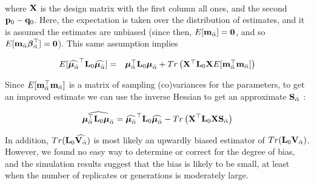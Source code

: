 \documentclass[12pt]{article}
\begin{document}
\begin{bibunit}
\begin{equation}
\begin{array}{rl}
\end{array}
\end{equation} 

where ${\bf X}$ is the design matrix with the first column all ones, and the second ${\bf p}_{0}-{\bf q}_{0}$. Here, the expectation is taken over the distribution of estimates, and it is assumed the estimates are unbiased (since then, $E[{\bf m}_{\bar{\alpha}}]={\bf 0}$, and so $E[{\bf m}_{\bar{\alpha}}{\boldsymbol \beta}_{\bar{\alpha}}^{\top}]={\bf 0}$). This same assumption implies


\begin{equation}
\begin{array}{rl}
E[\widehat{\boldsymbol{\mu}_{\bar{\alpha}}}^{\top}{\bf L}_0\widehat{\boldsymbol{\mu}_{\bar{\alpha}}}]=& \boldsymbol{\mu}_{\bar{\alpha}}^{\top}{\bf L}_0\boldsymbol{\mu}_{\bar{\alpha}}+Tr\left({\bf X}^{\top}{\bf L}_0{\bf X}E[{\bf m}_{\bar{\alpha}}^{\top}{\bf m}_{\bar{\alpha}}]\right)\\
\end{array}
\end{equation} 

Since $E[{\bf m}_{\bar{\alpha}}^{\top}{\bf m}_{\bar{\alpha}}]$ is a matrix of sampling (co)variances for the parameters, to get an improved estimate we can use the inverse Hessian to get an approximate ${\bf S}_{\bar{\alpha}}$ :

\begin{equation} 
\widehat{\boldsymbol{\mu}_{\bar{\alpha}}^{\top}{\bf L}_0\boldsymbol{\mu}_{\bar{\alpha}}}= \widehat{\boldsymbol{\mu}_{\bar{\alpha}}}^{\top}{\bf L}_0\widehat{\boldsymbol{\mu}_{\bar{\alpha}}}-Tr\left({\bf X}^{\top}{\bf L}_0{\bf X}{\bf S}_{\bar{\alpha}}\right)
\end{equation} 

In addition, $Tr({\bf L}_0\widehat{{\bf V}_{\bar \alpha}})$ is most likely an upwardly biased estimator of $Tr({\bf L}_0{\bf V}_{\bar \alpha})$. However, we found no easy way to determine or correct for the degree of bias, and the simulation results suggest that the bias is likely to be small, at least when the number of replicates or generations is moderately large.\\




\end{bibunit}
\end{document}
